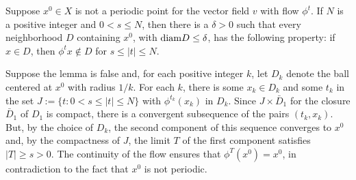 \begin{lem}\label{le1} Suppose $x^0\in X$ is not a periodic point
for the vector field $v$  with flow $\phi^t$. If  $N$ is a positive
integer and  $0<s\le N$, then there is a $\delta >0$ such that every
neighborhood $D$ containing $x^0$, with $\hbox{\rm diam} {D}\le\delta$, has the
following property: if $x\in D$, then $\phi^tx\not\in D$ for
$s\leq |t|\le N$.
\end{lem}
\begin{pf}
Suppose the lemma is false and, for each positive integer $k$,
let $D_k$ denote the ball centered
at $x^0$ with radius $1/k$.
For each $k$, there is some $x_k\in D_k$ and some
$t_k$ in the set $J:=\{t: 0<s\le|t|\le N\}$ with $\phi^{t_k}(x_k)$
in $D_k$. Since $J\times \bar D_1$
for the closure $\bar D_1$ of $D_1$
is compact, there is a convergent
subsequence of the pairs $(t_k,x_k)$. But, by the choice of $D_k$, the
second component of this sequence converges to $x^0$ and,
by the compactness of $J$,
the limit $T$ of the first component satisfies $|T|\ge s>0$.
The continuity of the flow ensures that $\phi^T(x^0)=x^0$,
in contradiction to the fact that $x^0$ is not periodic.
\end{pf}

